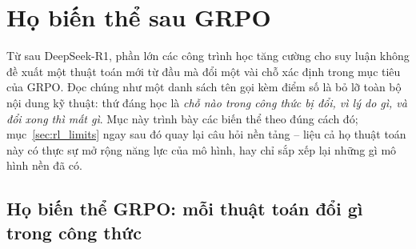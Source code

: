 
\section{Họ biến thể sau GRPO}
\label{sec:rl_algorithms}

Từ sau DeepSeek-R1, phần lớn các công trình học tăng cường cho suy luận không đề xuất một thuật toán mới từ đầu mà đổi một vài chỗ xác định trong mục tiêu của GRPO. Đọc chúng như một danh sách tên gọi kèm điểm số là bỏ lỡ toàn bộ nội dung kỹ thuật: thứ đáng học là \emph{chỗ nào trong công thức bị đổi, vì lý do gì, và đổi xong thì mất gì}. Mục này trình bày các biến thể theo đúng cách đó; mục~\ref{sec:rl_limits} ngay sau đó quay lại câu hỏi nền tảng -- liệu cả họ thuật toán này có thực sự mở rộng năng lực của mô hình, hay chỉ sắp xếp lại những gì mô hình nền đã có.

\subsection{Họ biến thể GRPO: mỗi thuật toán đổi gì trong công thức}
\label{ssec:grpo_variants}

